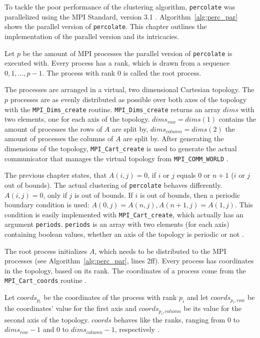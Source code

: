 \documentclass[twoside,11pt]{article}
\def\perc{\texttt{perco\-late}}
\begin{document}
To tackle the poor performance of the clustering algorithm,
\perc{} was parallelized using the MPI Standard,
version 3.1 \citep[see][]{mpi}.
Algorithm~\ref{alg:perc_par} shows the parallel version of
\perc{}.
This chapter outlines the implementation of the parallel
version and its intricacies.

Let $p$ be the amount of MPI processes the parallel version
of \perc{} is executed with.
Every process has a rank, which is drawn from a sequence
$0,1,\dots,p-1$.
The process with rank 0 is called the root process.

The processes are arranged in a virtual, two dimensional
Cartesian topology.
The $p$ processes are as evenly distributed as possible
over both axes of the topology with the
\texttt{MPI\_Dims\_create} routine.
\texttt{MPI\_Dims\_create} returns an array $dims$ with two
elements, one for each axis of the topology.
$dims_{row} = dims(1)$ contains the amount of processes the
rows of $A$ are split by, $dims_{column} = dims(2)$ the
amount of processes the columns of $A$ are split by.
After generating the dimensions of the topology,
\texttt{MPI\_Cart\_create} is used to generate the actual
communicator that manages the virtual topology from
\texttt{MPI\_COMM\_WORLD} \citep[see][Chapter 7]{mpi}.

The previous chapter states, that $A(i, j) = 0$, if $i$ or
$j$ equals $0$ or $n + 1$ ($i$ or $j$ out of bounds).
The actual clustering of \perc{} behaves differently.
$A(i, j) = 0$, only if $j$ is out of bounds.
If $i$ is out of bounds, then a periodic boundary condition
is used: $A(0, j) = A(n, j), A(n + 1, j) = A(1, j)$.
This condition is easily implemented with
\texttt{MPI\_Cart\_create}, which actually has an argument
\texttt{periods}. \texttt{periods} is an array with two
elements (for each axis) containing boolean values, whether
an axis of the topology is periodic or not
\citep[see][Chapter 7]{mpi}.

The root process initializes $A$, which needs to be
distributed to the MPI processes (see
Algorithm~\ref{alg:perc_par}, lines 2ff).
Every process has coordinates in the topology, based on
its rank.
The coordinates of a process come from the
\texttt{MPI\_Cart\_coords} routine
\citep[see][Chapter 7]{mpi}.

Let $coords_{p_i}$ be the coordinates of the process with
rank $p_i$ and let $coords_{p_i, row}$ be the coordinates'
value for the first axis and $coords_{p_i, column}$ be its
value for the second axis of the topology.
$coords$ behaves like the ranks, ranging from $0$ to
$dims_{row} - 1$ and $0$ to $dims_{column} - 1$,
respectively \citep[see][Chapter 7]{mpi}.
\end{document}

